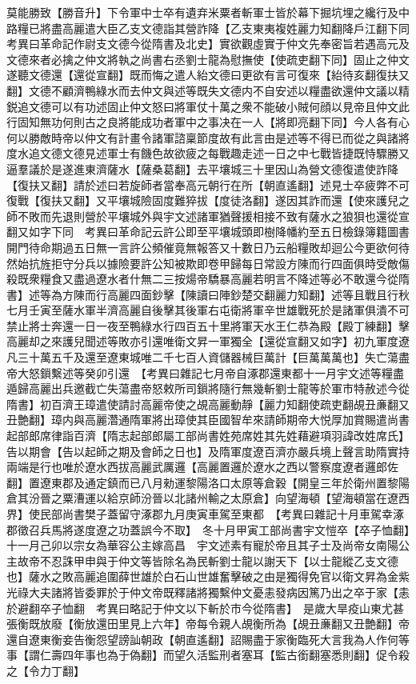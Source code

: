 莫能勝致【勝音升】下令軍中士卒有遺弃米粟者斬軍士皆於幕下掘坑埋之纔行及中路糧已將盡高麗遣大臣乙支文德詣其營詐降【乙支東夷複姓麗力知翻降戶江翻下同考異曰革命記作尉支文德今從隋書及北史】實欲觀虛實于仲文先奉密旨若遇高元及文德來者必擒之仲文將執之尚書右丞劉士龍為慰撫使【使疏吏翻下同】固止之仲文遂聽文德還【還從宣翻】既而悔之遣人紿文德曰更欲有言可復來【紿待亥翻復扶又翻】文德不顧濟鴨綠水而去仲文與述等既失文德内不自安述以糧盡欲還仲文議以精鋭追文德可以有功述固止仲文怒曰將軍仗十萬之衆不能破小賊何顔以見帝且仲文此行固知無功何則古之良將能成功者軍中之事决在一人【將即亮翻下同】今人各有心何以勝敵時帝以仲文有計畫令諸軍諮稟節度故有此言由是述等不得已而從之與諸將度水追文德文德見述軍士有饑色故欲疲之每戰趣走述一日之中七戰皆捷既恃驟勝又逼羣議於是遂進東濟薩水【薩桑葛翻】去平壤城三十里因山為營文德復遣使詐降【復扶又翻】請於述曰若旋師者當奉高元朝行在所【朝直遙翻】述見士卒疲弊不可復戰【復扶又翻】又平壤城險固度難猝拔【度徒洛翻】遂因其詐而還【使來護兒之師不敗而先退則營於平壤城外與宇文述諸軍猶聲援相接不致有薩水之狼狽也還從宣翻又如字下同　考異曰革命記云許公即至平壤城頭即樹降幡約至五日檢錄簿籍圖書開門待命期過五日無一言許公頻催竟無報答又十數日乃云船糧敗却迴公今更欲何待然始抗旌拒守分兵以據險要許公知被欺即卷甲歸每日常設方陳而行四面俱時受敵傷殺既衆糧食又盡過遼水者什無二三按煬帝驕暴高麗若明言不降述等必不敢還今從隋書】述等為方陳而行高麗四面鈔擊【陳讀曰陣鈔楚交翻麗力知翻】述等且戰且行秋七月壬寅至薩水軍半濟高麗自後擊其後軍右屯衛將軍辛世雄戰死於是諸軍俱潰不可禁止將士奔還一日一夜至鴨綠水行四百五十里將軍天水王仁恭為殿【殿丁練翻】擊高麗却之來護兒聞述等敗亦引還唯衛文昇一軍獨全【還從宣翻又如字】初九軍度遼凡三十萬五千及還至遼東城唯二千七百人資儲器械巨萬計【巨萬萬萬也】失亡蕩盡帝大怒鎻繫述等癸卯引還　【考異曰雜記七月帝自涿郡還東都十一月宇文述等糧盡遁歸高麗出兵邀截亡失蕩盡帝怒敕所司鎻將隨行無幾斬劉士龍等於軍市特赦述今從隋書】初百濟王璋遣使請討高麗帝使之覘高麗動靜【麗力知翻使疏吏翻覘丑亷翻又丑艶翻】璋内與高麗濳通隋軍將出璋使其臣國智牟來請師期帝大悦厚加賞賜遣尚書起部郎席律詣百濟【隋志起部郎屬工部尚書姓苑席姓其先姓藉避項羽諱改姓席氏】告以期會【告以起師之期及會師之日也】及隋軍度遼百濟亦嚴兵境上聲言助隋實持兩端是行也唯於遼水西拔高麗武厲邏【高麗置邏於遼水之西以警察度遼者邏郎佐翻】置遼東郡及通定鎮而已八月勑運黎陽洛口太原等倉穀【開皇三年於衛州置黎陽倉其汾晉之粟漕運以給京師汾晉以北諸州輸之太原倉】向望海頓【望海頓當在遼西界】使民部尚書樊子蓋留守涿郡九月庚寅車駕至東都　【考異曰雜記十月車駕幸涿郡徵召兵馬將遂度遼之功蓋誤今不取】　冬十月甲寅工部尚書宇文愷卒【卒子恤翻】　十一月己卯以宗女為華容公主嫁高昌　宇文述素有寵於帝且其子士及尚帝女南陽公主故帝不忍誅甲申與于仲文等皆除名為民斬劉士龍以謝天下【以士龍縱乙支文德也】薩水之敗高麗追圍薛世雄於白石山世雄奮擊破之由是獨得免官以衛文昇為金紫光祿大夫諸將皆委罪於于仲文帝既釋諸將獨繫仲文憂恚發病因篤乃出之卒于家【恚於避翻卒子恤翻　考異曰略記于仲文以下斬於市今從隋書】　是歲大旱疫山東尤甚　張衡既放廢【衡放還田里見上六年】帝每令親人覘衡所為【覘丑亷翻又丑艶翻】帝還自遼東衡妾告衡怨望謗訕朝政【朝直遙翻】詔賜盡于家衡臨死大言我為人作何等事【謂仁壽四年事也為于偽翻】而望久活監刑者塞耳【監古銜翻塞悉則翻】促令殺之【令力丁翻】

